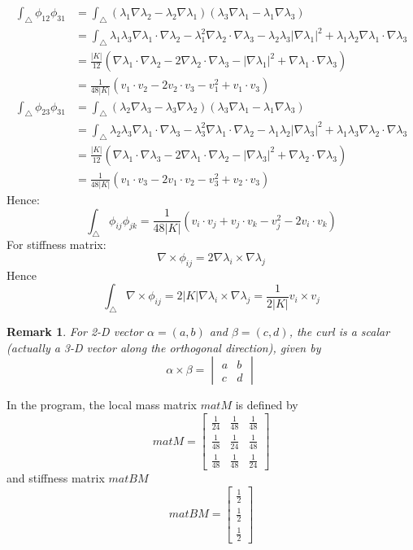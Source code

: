 \documentclass[12pt,reqno]{amsart}
\numberwithin{equation}{section}
\newtheorem{remark}{Remark}
\begin{document}
\begin{align*}
	\int_{\triangle}\phi_{12}\phi_{31}	&=\int_{\triangle} (\lambda_1\nabla\lambda_2-\lambda_2\nabla\lambda_1)(\lambda_3\nabla\lambda_1-\lambda_1\nabla\lambda_3)\\
	&=\int_{\triangle}\lambda_1\lambda_3\nabla\lambda_1\cdot\nabla\lambda_2-\lambda_1^2\nabla\lambda_2\cdot\nabla\lambda_3-\lambda_2\lambda_3|\nabla\lambda_1|^2+\lambda_1\lambda_2\nabla\lambda_1\cdot\nabla\lambda_3\\
	&=\frac{|K|}{12}(\nabla\lambda_1\cdot\nabla\lambda_2-2\nabla\lambda_2\cdot\nabla\lambda_3-|\nabla\lambda_1|^2+\nabla\lambda_1\cdot\nabla\lambda_3)\\
	&=\frac{1}{48|K|}(v_1\cdot v_2-2v_2\cdot v_3-v_1^2+v_1\cdot v_3)
\end{align*}
\begin{align*}
	\int_{\triangle}\phi_{23}\phi_{31}	&=\int_{\triangle} (\lambda_2\nabla\lambda_3-\lambda_3\nabla\lambda_2)(\lambda_3\nabla\lambda_1-\lambda_1\nabla\lambda_3)\\
	&=\int_{\triangle}\lambda_2\lambda_3\nabla\lambda_1\cdot\nabla\lambda_3-\lambda_3^2\nabla\lambda_1\cdot\nabla\lambda_2-\lambda_1\lambda_2|\nabla\lambda_3|^2+\lambda_1\lambda_3\nabla\lambda_2\cdot\nabla\lambda_3\\
	&=\frac{|K|}{12}(\nabla\lambda_1\cdot\nabla\lambda_3-2\nabla\lambda_1\cdot\nabla\lambda_2-|\nabla\lambda_3|^2+\nabla\lambda_2\cdot\nabla\lambda_3)\\
	&=\frac{1}{48|K|}(v_1\cdot v_3-2v_1\cdot v_2-v_3^2+v_2\cdot v_3)
\end{align*}
Hence:
\[
\int_{\triangle}\phi_{ij}\phi_{jk}=\frac{1}{48|K|}(v_i\cdot v_j+v_j\cdot v_k-v_j^2-2v_i\cdot v_k)
\]
For stiffness matrix:
\[
\nabla\times \phi_{ij} = 2\nabla\lambda_i\times \nabla\lambda_j
\]
Hence
\[
\int_{\triangle}\nabla\times \phi_{ij} = 2|K|\nabla\lambda_i\times \nabla\lambda_j=\frac{1}{2|K|}v_i\times v_j
\]
\begin{remark}
	For 2-D vector $ \alpha=(a,b) $ and $ \beta=(c,d) $, the curl is a scalar (actually a 3-D vector along the orthogonal direction), given by
	\[
	\alpha\times \beta = 
	\begin{vmatrix}
	a	&	b\\
	c	&	d
	\end{vmatrix}
	\]
\end{remark}
In the program, the local mass matrix $ matM $ is defined by
\[
matM=
\begin{bmatrix}
\frac{1}{24}	&	\frac{1}{48}	&	\frac{1}{48}\\
\frac{1}{48}	&	\frac{1}{24}	&	\frac{1}{48}\\
\frac{1}{48}	&	\frac{1}{48}	&	\frac{1}{24}
\end{bmatrix}
\]
and stiffness matrix $ matBM $
\[
matBM=
\begin{bmatrix}
\frac{1}{2}\\
\frac{1}{2}\\
\frac{1}{2}
\end{bmatrix}
\]
\end{document}
